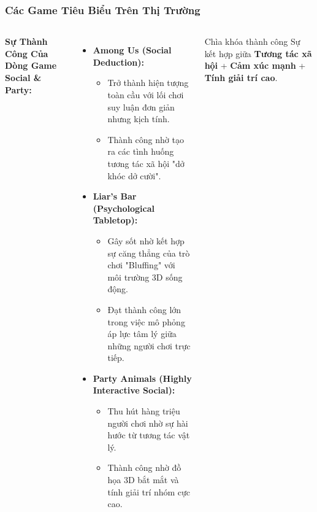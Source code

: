 \begin{frame}
\frametitle{Các Game Tiêu Biểu Trên Thị Trường}
\begin{columns}
    \textbf{Sự Thành Công Của Dòng Game Social \& Party:}
    
    \begin{itemize}
        \item \textbf{Among Us (Social Deduction):}
        \begin{itemize}
            \item Trở thành hiện tượng toàn cầu với lối chơi suy luận đơn giản nhưng kịch tính.
            \item Thành công nhờ tạo ra các tình huống tương tác xã hội "dở khóc dở cười".
        \end{itemize}
        
        \item \textbf{Liar's Bar (Psychological Tabletop):}
        \begin{itemize}
            \item Gây sốt nhờ kết hợp sự căng thẳng của trò chơi "Bluffing" với môi trường 3D sống động.
            \item Đạt thành công lớn trong việc mô phỏng áp lực tâm lý giữa những người chơi trực tiếp.
        \end{itemize}
        
        \item \textbf{Party Animals (Highly Interactive Social):}
        \begin{itemize}
            \item Thu hút hàng triệu người chơi nhờ sự hài hước từ tương tác vật lý.
            \item Thành công nhờ đồ họa 3D bắt mắt và tính giải trí nhóm cực cao.
        \end{itemize}
    \end{itemize}

    \centering
    
    \vspace{0.5em}
    \begin{block}{Chìa khóa thành công}
        Sự kết hợp giữa \textbf{Tương tác xã hội} + \textbf{Cảm xúc mạnh} + \textbf{Tính giải trí cao}.
    \end{block}
\end{columns}

\end{frame}

